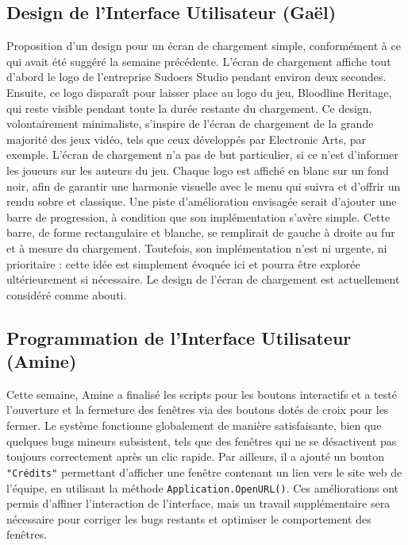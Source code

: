 \documentclass{report}
\begin{document}
\subsection*{Design de l'Interface Utilisateur (Gaël)}
Proposition d'un design pour un écran de chargement simple, conformément à ce qui avait été suggéré la semaine précédente. L'écran de chargement affiche tout d'abord le logo de l'entreprise Sudoers Studio pendant environ deux secondes. Ensuite, ce logo disparaît pour laisser place au logo du jeu, Bloodline Heritage, qui reste visible pendant toute la durée restante du chargement. Ce design, volontairement minimaliste, s'inspire de l'écran de chargement de la grande majorité des jeux vidéo, tels que ceux développés par Electronic Arts, par exemple. L'écran de chargement n'a pas de but particulier, si ce n'est d'informer les joueurs sur les auteurs du jeu. Chaque logo est affiché en blanc sur un fond noir, afin de garantir une harmonie visuelle avec le menu qui suivra et d'offrir un rendu sobre et classique. Une piste d'amélioration envisagée serait d'ajouter une barre de progression, à condition que son implémentation s'avère simple. Cette barre, de forme rectangulaire et blanche, se remplirait de gauche à droite au fur et à mesure du chargement. Toutefois, son implémentation n'est ni urgente, ni prioritaire : cette idée est simplement évoquée ici et pourra être explorée ultérieurement si nécessaire. Le design de l'écran de chargement est actuellement considéré comme abouti.

\subsection*{Programmation de l'Interface Utilisateur (Amine)}
Cette semaine, Amine a finalisé les scripts pour les boutons interactifs et a testé l’ouverture et la fermeture des fenêtres via des boutons dotés de croix pour les fermer. Le système fonctionne globalement de manière satisfaisante, bien que quelques bugs mineurs subsistent, tels que des fenêtres qui ne se désactivent pas toujours correctement après un clic rapide. Par ailleurs, il a ajouté un bouton \texttt{"Crédits"} permettant d’afficher une fenêtre contenant un lien vers le site web de l’équipe, en utilisant la méthode \texttt{Application.OpenURL()}. Ces améliorations ont permis d’affiner l’interaction de l’interface, mais un travail supplémentaire sera nécessaire pour corriger les bugs restants et optimiser le comportement des fenêtres.
\end{document}
